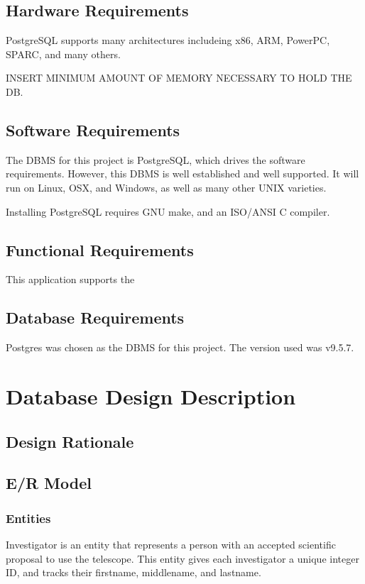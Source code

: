 \documentclass[a4paper,11pt]{article}
\begin{document}
\subsection{Hardware Requirements}
PostgreSQL supports many architectures includeing x86, ARM, PowerPC, SPARC, and many others.

INSERT MINIMUM AMOUNT OF MEMORY NECESSARY TO HOLD THE DB.

\subsection{Software Requirements}
The DBMS for this project is PostgreSQL, which drives the software requirements.  However, this DBMS is well established and well supported.  It will run on Linux, OSX, and Windows, as well as many other UNIX varieties.  

Installing PostgreSQL requires GNU make, and an ISO/ANSI C compiler.
\subsection{Functional Requirements}
This application supports the

\subsection{Database Requirements}
Postgres was chosen as the DBMS for this project.  The version used was v9.5.7.

\section{Database Design Description}

\subsection{Design Rationale}


\subsection{E/R Model}

\subsubsection{Entities}
Investigator is an entity that represents a person with an accepted scientific proposal to use the telescope.  This entity gives each investigator a unique integer ID, and tracks their firstname, middlename, and lastname.  
\end{document}
